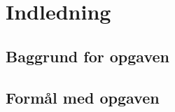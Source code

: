 \graphicspath{{Chapters/Indledning/}}

\chapter{Indledning}

\section{Baggrund for opgaven}

\section{Formål med opgaven}
